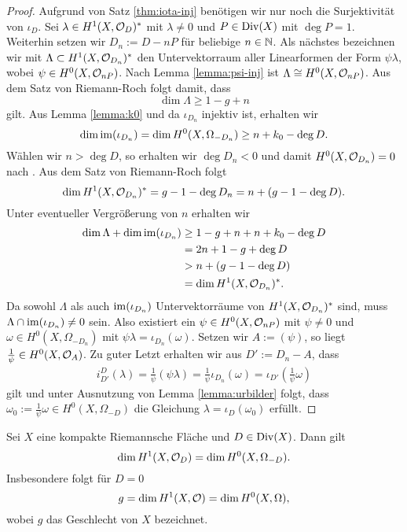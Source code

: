 \begin{proof}
  Aufgrund von Satz \ref{thm:iota-inj} benötigen wir nur noch die
  Surjektivität von $\iota_D$. Sei $\lambda \in H^1(X, \mathcal{O}_D)^\ast$
  mit $\lambda \neq 0$ und $P \in \operatorname{Div}(X)$ mit $\deg P = 1$. Weiterhin
  setzen wir $D_n := D - n P$ für beliebige $n \in \mathbb{N}$. Als nächstes
  bezeichnen wir mit $\Lambda \subset H^1(X, \mathcal{O}_{D_n})^\ast$ den
  Untervektorraum aller Linearformen der Form $\psi \lambda$, wobei
  $\psi \in H^0(X, \mathcal{O}_{nP})$. Nach Lemma \ref{lemma:psi-inj} ist
  $\Lambda \cong H^0(X, \mathcal{O}_{nP})$. Aus dem Satz von Riemann-Roch
  folgt damit, dass
  \[
  \dim \Lambda \geq 1 - g + n
  \]
  gilt. Aus Lemma \ref{lemma:k0} und da $\iota_{D_n}$ injektiv ist,
  erhalten wir
  \[
  \dim \operatorname{im}(\iota_{D_n}) = \dim H^0(X, \Omega_{-D_n}) \geq n + k_0 -
  \deg D.
  \]
  Wählen wir $n > \deg D$, so erhalten wir $\deg D_n < 0$ und damit
  $H^0(X, \mathcal{O}_{D_n}) = 0$ nach \cite[Satz 16.5]{For}. Aus dem Satz von Riemann-Roch folgt
  \[
  \dim H^1(X, \mathcal{O}_{D_n})^\ast = g - 1 - \deg D_n = n + ( g - 1 -
  \deg D).
  \]
  Unter eventueller Vergrößerung von $n$ erhalten wir
  \begin{align*}
    \dim \Lambda + \dim \operatorname{im}(\iota_{D_n}) & \geq 1 - g + n + n + k_0 -
    \deg D \\
    & = 2 n + 1 - g + \deg D \\
    & > n + (g - 1 - \deg D) \\
    & = \dim H^1(X, \mathcal{O}_{D_n})^\ast.
  \end{align*}
  Da sowohl $\Lambda$ als auch $\operatorname{im}(\iota_{D_n})$ Untervektorräume von
  $H^1(X, \mathcal{O}_{D_n})^\ast$ sind, muss $\Lambda \cap \operatorname{im}(\iota_{D_n})
  \neq 0$ sein. Also existiert ein $\psi \in H^0(X, \mathcal{O}_{nP})$ mit
  $\psi \neq 0$ und $\omega \in H^0(X, \Omega_{-D_n})$ mit $\psi
  \lambda = \iota_{D_n}(\omega)$. Setzen wir $A := (\psi)$, so liegt
  $\frac{1}{\psi} \in H^0(X, \mathcal{O}_A)$. Zu guter Letzt erhalten wir aus
  $D' := D_n - A$, dass
  \begin{align*}
    i_{D'}^D(\lambda) = \frac{1}{\psi} (\psi \lambda) =
    \frac{1}{\psi} \iota_{D_n}(\omega) = \iota_{D'} \left (
      \frac{1}{\psi} \omega \right )
  \end{align*}
  gilt und unter Ausnutzung von Lemma \ref{lemma:urbilder} folgt, dass
  $\omega_0 := \frac{1}{\psi} \omega \in H^0(X, \Omega_{-D})$ die
  Gleichung $\lambda = \iota_D(\omega_0)$ erfüllt.
\end{proof}

\begin{cor}
  \label{cor:dim-1-form}
  Sei $X$ eine kompakte Riemannsche Fläche und $D \in \operatorname{Div}(X)$. Dann
  gilt
  \[
  \dim H^1(X, \mathcal{O}_D) = \dim H^0(X, \Omega_{-D}).
  \]
  Insbesondere folgt für $D = 0$
  \[
  g = \dim H^1(X, \mathcal{O}) = \dim H^0(X, \Omega),
  \]
  wobei $g$ das Geschlecht von $X$ bezeichnet.
\end{cor}

